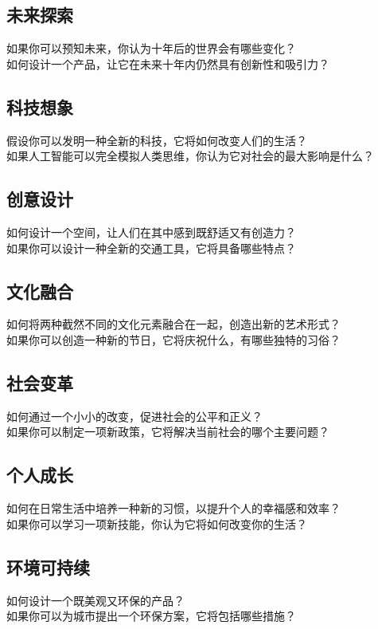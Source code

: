 \documentclass[12pt]{book}
\begin{document}
\subsection{未来探索}
如果你可以预知未来，你认为十年后的世界会有哪些变化？\\
如何设计一个产品，让它在未来十年内仍然具有创新性和吸引力？\\

\subsection{科技想象}
假设你可以发明一种全新的科技，它将如何改变人们的生活？\\
如果人工智能可以完全模拟人类思维，你认为它对社会的最大影响是什么？\\

\subsection{创意设计}
如何设计一个空间，让人们在其中感到既舒适又有创造力？\\
如果你可以设计一种全新的交通工具，它将具备哪些特点？\\
\subsection{文化融合}
如何将两种截然不同的文化元素融合在一起，创造出新的艺术形式？\\
如果你可以创造一种新的节日，它将庆祝什么，有哪些独特的习俗？\\
\subsection{社会变革}
如何通过一个小小的改变，促进社会的公平和正义？\\
如果你可以制定一项新政策，它将解决当前社会的哪个主要问题？\\
\subsection{个人成长}
如何在日常生活中培养一种新的习惯，以提升个人的幸福感和效率？\\
如果你可以学习一项新技能，你认为它将如何改变你的生活？\\
\subsection{环境可持续}
如何设计一个既美观又环保的产品？\\
如果你可以为城市提出一个环保方案，它将包括哪些措施？\\
\end{document}
